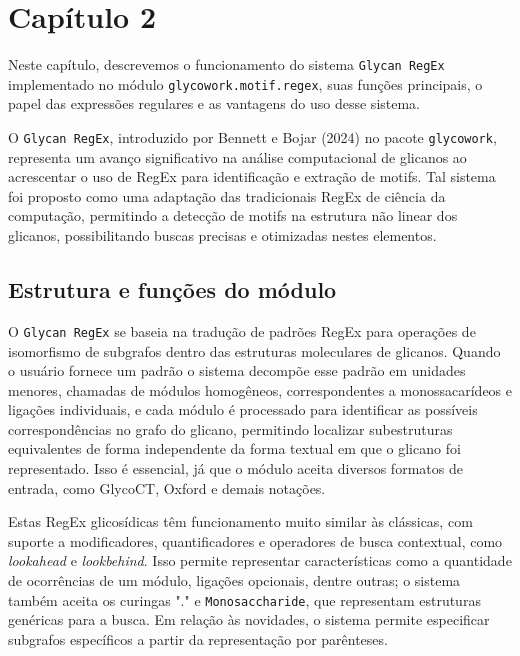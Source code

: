 \chapter{Capítulo 2}

Neste capítulo, descrevemos o funcionamento do sistema \texttt{Glycan RegEx}
implementado no módulo \texttt{glycowork.motif.regex}, suas funções principais,
o papel das expressões regulares e as vantagens do uso desse sistema.

O \texttt{Glycan RegEx}, introduzido por Bennett e Bojar (2024) no pacote
\texttt{glycowork}, representa um avanço significativo na análise computacional
de glicanos ao acrescentar o uso de RegEx para identificação e extração de
motifs. Tal sistema foi proposto como uma adaptação das tradicionais RegEx de
ciência da computação, permitindo a detecção de motifs na estrutura não linear
dos glicanos, possibilitando buscas precisas e otimizadas nestes elementos.

\section{Estrutura e funções do módulo}

O \texttt{Glycan RegEx} se baseia na tradução de padrões RegEx para operações
de isomorfismo de subgrafos dentro das estruturas moleculares de glicanos.
Quando o usuário fornece um padrão
o sistema decompõe esse padrão em unidades menores, chamadas de módulos
homogêneos, correspondentes a monossacarídeos e ligações individuais, e cada
módulo é processado para identificar as possíveis correspondências no grafo do
glicano, permitindo localizar subestruturas equivalentes de forma independente
da forma textual em que o glicano foi representado. Isso é essencial, já que o
módulo aceita diversos formatos de entrada, como GlycoCT, Oxford e demais
notações.

Estas RegEx glicosídicas têm funcionamento muito similar às clássicas, com
suporte a modificadores, quantificadores e operadores de busca contextual, como
\textit{lookahead} e \textit{lookbehind}. Isso permite representar
características como a quantidade de ocorrências de um módulo, ligações
opcionais, dentre outras; o sistema também aceita os curingas "." e
\texttt{Monosaccharide}, que representam estruturas genéricas para a busca. Em
relação às novidades, o sistema permite especificar subgrafos específicos a
partir da representação por parênteses.

